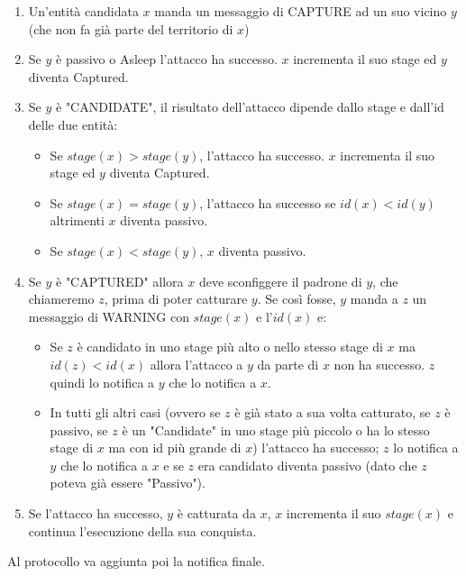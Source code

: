 \begin{enumerate}
    \item Un'entità candidata $x$ manda un messaggio di CAPTURE ad un suo vicino
          $y$ (che non fa già parte del territorio di $x$)
    \item Se $y$ è passivo o Asleep l'attacco ha successo. $x$ incrementa il suo
          stage ed $y$ diventa Captured.
    \item Se $y$ è "CANDIDATE", il risultato dell'attacco dipende dallo stage e
          dall'id delle due entità:
          \begin{itemize}
              \item Se $stage(x) > stage(y)$, l'attacco ha successo. $x$
                    incrementa il suo stage ed $y$ diventa Captured.
              \item Se $stage(x) = stage(y)$, l'attacco ha successo se $id(x) <
                        id(y)$ altrimenti $x$ diventa passivo.
              \item Se $stage(x) < stage(y)$, $x$ diventa passivo.
          \end{itemize}
    \item Se $y$ è "CAPTURED" allora $x$ deve sconfiggere il padrone di $y$, che
          chiameremo $z$, prima di poter catturare $y$. Se così fosse, $y$ manda
          a $z$ un messaggio di WARNING con $stage(x)$ e l'$id(x)$ e:
          \begin{itemize}
              \item Se $z$ è candidato in uno stage più alto o nello stesso
                    stage di $x$ ma $id(z) < id(x)$ allora l'attacco a $y$ da parte
                    di $x$ non ha successo. $z$ quindi lo notifica a $y$ che lo
                    notifica a $x$.
              \item In tutti gli altri casi (ovvero se $z$ è già stato a sua
                    volta catturato, se $z$ è passivo, se $z$ è un "Candidate"
                    in uno stage più piccolo o ha lo stesso stage di $x$ ma con id
                    più grande di $x$) l'attacco ha successo; $z$ lo notifica a $y$
                    che lo notifica a $x$ e se $z$ era candidato diventa passivo
                    (dato che $z$ poteva già essere "Passivo").
          \end{itemize}
    \item Se l'attacco ha successo, $y$ è catturata da $x$, $x$ incrementa il suo
          $stage(x)$ e continua l'esecuzione della sua conquista.
\end{enumerate}
Al protocollo va aggiunta poi la notifica finale.

